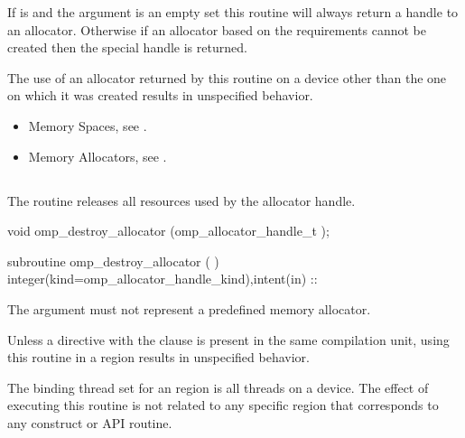 If  is  and the  
argument is an empty set this routine will always return a handle to an 
allocator. Otherwise if an allocator based on the requirements cannot be 
created then the special  handle is returned.

The use of an allocator returned by this routine on a device other than 
the one on which it was created results in unspecified behavior.

\crossreferences
\begin{itemize}
\item Memory Spaces, see .

\item Memory Allocators, see .
\end{itemize}



\subsection{}
\label{subsec:omp_destroy_allocator}

\summary
The  routine releases all resources 
used by the allocator handle.

\format
\begin{ccppspecific}
\begin{ompcFunction}
void omp_destroy_allocator (omp_allocator_handle_t );
\end{ompcFunction}
\end{ccppspecific}

\begin{fortranspecific}
\begin{ompfSubroutine}
subroutine omp_destroy_allocator (  )
integer(kind=omp_allocator_handle_kind),intent(in) :: 
\end{ompfSubroutine}
\end{fortranspecific}

\constraints
The  argument must not represent a predefined memory allocator.

Unless a  directive with the  
clause is present in the same compilation unit, using this routine in 
a  region results in unspecified behavior.

\binding
The binding thread set for an  region is 
all threads on a device. The effect of executing this routine is not 
related to any specific region that corresponds to any construct or API routine.


